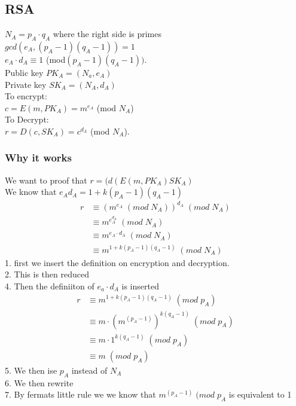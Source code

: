 \documentclass[12pt, a4paper]{article}
\begin{document}
			\subsection{RSA}
				$N_A=p_A\cdot q_A$ where the right side is primes\\
				$gcd(e_A,(p_A-1)(q_A-1))=1$\\
				$e_A\cdot d_A\equiv 1$ (mod$(p_A-1)(q_A-1))$.\\
				Public key $PK_A=(N_a,e_A)$\\
				Private key $SK_A=(N_A,d_A)$\\[4mm]
				To encrypt:\\
				$c=E(m,PK_A)=m^{e_A}$ (mod $N_A$)\\
				To Decrypt:\\
				$r=D(c,SK_A)=c^{d_A} $ (mod $N_A$).
				\subsubsection{Why it works}
					We want to proof that $r=(d(E(m,PK_A)SK_A)$\\
					We know that $e_Ad_A=1+k(p_A-1)(q_A-1)$\\
					\begin{align}
						r&\equiv(m^{e_A}\;(mod\;N_A))^{d_A}\;(mod\;N_A)\\
						 &\equiv m^{e_A^{d_A}}\;(mod\;N_A)\\
						 &\equiv m^{e_A\cdot d_A}\;(mod\;N_A)\\
						 &\equiv m^{1+k(p_A-1)(q_A-1)}\;(mod\;N_A)
					\end{align}
					1. first we insert the definition on encryption and decryption.\\
					2. This is then reduced\\
					4. Then the definiiton of $e_a\cdot d_A$ is inserted\\
					\begin{align}
						r&\equiv m^{1+k(p_A-1)(q_A-1)}\;(mod\;p_A)\\
						 &\equiv m\cdot (m^{(p_A-1)})^{k(q_A-1)}\;(mod\;p_A)\\
						 &\equiv m\cdot 1^{k(q_A-1)}\;(mod\;p_A)\\
						 &\equiv m\;(mod\;p_A)
					\end{align}
					5. We then ise $p_A$ instead of $N_A$\\
					6. We then rewrite\\
					7. By fermats little rule we we know that $m^{(p_A-1)}\;(mod\;p_A$ is equivalent to 1\\
\end{document}
